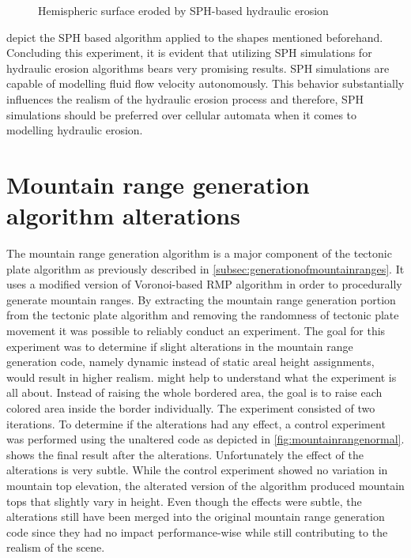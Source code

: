 \documentclass[11pt,a4paper,twoside,openright]{report}
\begin{document}
\begin{figure}[!htb]
  \caption{Hemispheric surface eroded by SPH-based hydraulic erosion}\label{fig:hydro6}
\endminipage
\end{figure}
 depict the SPH based algorithm applied to the shapes mentioned beforehand. Concluding this experiment, it is evident that utilizing SPH simulations for hydraulic erosion algorithms bears very promising results. SPH simulations are capable of modelling fluid flow velocity autonomously. This behavior substantially influences the realism of the hydraulic erosion process and therefore, SPH simulations should be preferred over cellular automata when it comes to modelling hydraulic erosion.

\section{Mountain range generation algorithm alterations}
The mountain range generation algorithm is a major component of the tectonic plate algorithm as previously described in \cref{subsec:generationofmountainranges}. It uses a modified version of Voronoi-based RMP algorithm in order to procedurally generate mountain ranges. By extracting the mountain range generation portion from the tectonic plate algorithm and removing the randomness of tectonic plate movement it was possible to reliably conduct an experiment. The goal for this experiment was to determine if slight alterations in the mountain range generation code, namely dynamic instead of static areal height assignments, would result in higher realism.  might help to understand what the experiment is all about. Instead of raising the whole bordered area, the goal is to raise each colored area inside the border individually. The experiment consisted of two iterations. To determine if the alterations had any effect, a control experiment was performed using the unaltered code as depicted in \cref{fig:mountainrangenormal}.  shows the final result after the alterations. Unfortunately the effect of the alterations is very subtle. While the control experiment showed no variation in mountain top elevation, the alterated version of the algorithm produced mountain tops that slightly vary in height. Even though the effects were subtle, the alterations still have been merged into the original mountain range generation code since they had no impact performance-wise while still contributing to the realism of the scene.
\end{document}
